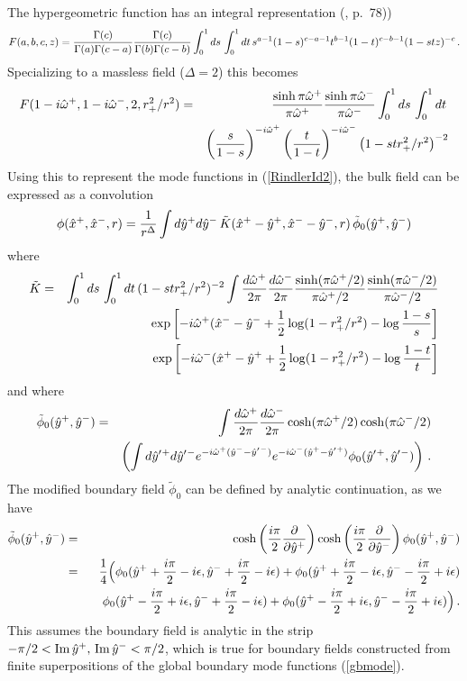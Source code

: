 \documentclass[12pt]{article}
\newcommand{\be}{\begin{equation}}
\newcommand{\ee}{\end{equation}}
\newcommand{\bea}{\begin{eqnarray}}
\newcommand{\eea}{\end{eqnarray}}
\newcommand{\beas}{\begin{eqnarray*}}
\newcommand{\eeas}{\end{eqnarray*}}
\newcommand{\hw}{\hat{\omega}}
\newcommand{\hx}{\hat{x}}
\newcommand{\hy}{\hat{y}}
\begin{document}
The hypergeometric function has an integral representation (\cite{Bateman}, p.~78))
\[
F(a,b,c,z) = {\Gamma(c) \over \Gamma(a) \Gamma(c - a)} {\Gamma(c) \over \Gamma(b) \Gamma(c - b)}
\int_0^1 ds \, \int_0^1 dt\, s^{a - 1} (1-s)^{c - a - 1} t^{b - 1} (1 - t)^{c - b - 1} (1 - stz)^{-c}\,.
\]
Specializing to a massless field ($\Delta = 2$) this becomes
%
\beas
F(1 - i \hat{\omega}^+, 1 - i \hat{\omega}^-, 2, r_+^2 / r^2) & = & {\sinh \pi \hw^+ \over \pi \hw^+}
{\sinh \pi \hw^- \over \pi \hw^-} \int_0^1 ds \, \int_0^1 dt \, \\
& & \left(s \over 1 - s \right)^{-i \hw^+} \left(t \over 1 - t \right)^{-i \hw^-} \left(1 - s t r_+^2 / r^2\right)^{-2}
\eeas
%
Using this to represent the mode functions in (\ref{RindlerId2}), the bulk field can be expressed as a convolution
%
\be
\label{RindlerConvolution}
\phi(\hx^+,\hx^-,r) = {1 \over r^\Delta} \int d\hy^+ d\hy^- \, \tilde{K}(\hx^+ - \hy^+,\hx^- - \hy^-,r) \,
\tilde{\phi}_0(\hy^+,\hy^-)
\ee
%
where
%
\bea
\nonumber
\tilde{K} & = & \int_0^1 ds \, \int_0^1 dt \, (1 - s t r_+^2 / r^2)^{-2} \int {d\hw^+ \over 2 \pi} {d\hw^- \over 2 \pi}
{\sinh (\pi \hw^+ / 2) \over \pi \hw^+ / 2} {\sinh (\pi \hw^- / 2) \over \pi \hw^- / 2} \\
& & \exp\left[-i \hw^+ (\hx^- - \hy^- + {1 \over 2} \log(1 - r_+^2/r^2) - \log {1 - s \over s}\right] \\
\nonumber
& & \exp\left[-i \hw^- (\hx^+ - \hy^+ + {1 \over 2} \log(1 - r_+^2/r^2) - \log {1 - t \over t}\right]
\eea
%
and where
%
\bea
\tilde{\phi}_0(\hy^+,\hy^-) & = & \int {d\hw^+ \over 2\pi} {d\hw^- \over 2\pi} \cosh (\pi \hw^+ / 2) \cosh (\pi \hw^-/2) \\
\nonumber
& & \left(\int d\hy'{}^+ d\hy'{}^- e^{-i \hw^+ (\hy^- - \hy'{}^-)} e^{-i \hw^- (\hy^+ - \hy'{}^+)} \phi_0(\hy'{}^+,\hy'{}^-) \right)\,.
\eea
%
The modified boundary field $\tilde{\phi}_0$ can be defined by analytic continuation, as we have
%
\beas
\tilde{\phi}_0(\hy^+,\hy^-) & = & \cosh \left({i \pi \over 2} {\partial \over \partial \hy^+}\right)
\cosh \left({i \pi \over 2} {\partial \over \partial \hy^-}\right) \phi_0(\hy^+,\hy^-) \\
& = & {1 \over 4} \Bigl( \phi_0(\hy^+ + {i \pi \over 2} - i \epsilon, \hy^- + {i \pi \over 2} - i \epsilon) +
\phi_0(\hy^+ + {i \pi \over 2} - i \epsilon, \hy^- - {i \pi \over 2} + i \epsilon) \\
& & \quad \phi_0(\hy^+ - {i \pi \over 2} + i \epsilon, \hy^- + {i \pi \over 2} - i \epsilon) +
\phi_0(\hy^+ - {i \pi \over 2} + i \epsilon, \hy^- - {i \pi \over 2} + i \epsilon) \Bigr)\,.
\eeas
%
This assumes the boundary field is analytic in the strip $-\pi/2 <
{\rm Im} \, \hy^+,\, {\rm Im} \, \hy^- < \pi/2$, which is true for
boundary fields constructed from finite superpositions of the global
boundary mode functions (\ref{gbmode}).
\end{document}
